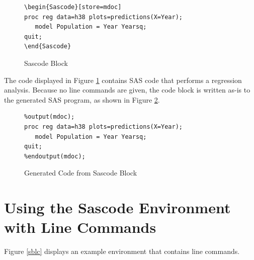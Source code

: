 \documentclass[article,oneside]{memoir}
\begin{document}
\begin{figure}[H]
\begin{snugshade}
\begin{verbatim}
\begin{Sascode}[store=mdoc]
proc reg data=h38 plots=predictions(X=Year);
   model Population = Year Yearsq;
quit;
\end{Sascode}
\end{verbatim}
\end{snugshade}
\caption{Sascode Block}\label{sb}
\end{figure}
  The code displayed in Figure \ref{sb} contains SAS code that
performs a regression analysis. Because no line commands are given,
the code block is written as-is to the generated SAS program, as shown
in Figure \ref{figsb}.
\begin{figure}[H]
\begin{snugshade}
\begin{verbatim}
%output(mdoc);
proc reg data=h38 plots=predictions(X=Year);
   model Population = Year Yearsq;
quit;
%endoutput(mdoc);
\end{verbatim}
\end{snugshade}
\caption{Generated Code from Sascode Block }\label{figsb}
\end{figure}

\section{Using the Sascode Environment with Line Commands}\label{scexlc}
Figure \ref{sblc} displays an example
   environment that contains line commands.
\end{document}
